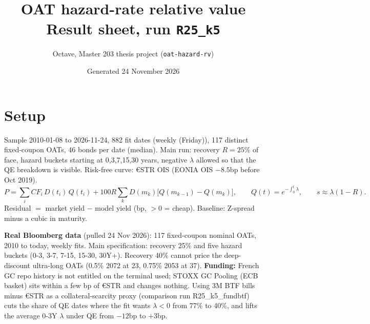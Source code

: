 \documentclass[10pt,a4paper]{article}
\title{\textbf{OAT hazard-rate relative value}\\\large Result sheet, run \texttt{R25\_k5}}
\author{Octave, Master 203 thesis project (\texttt{oat-hazard-rv})}
\date{Generated 24 November 2026}
\begin{document}
\maketitle


\section*{Setup}
Sample 2010-01-08 to 2026-11-24, 882 fit dates (weekly (Friday)),
117 distinct fixed-coupon OATs, 46 bonds per date (median).
Main run: recovery $R=25\%$ of face, hazard buckets starting at 0,3,7,15,30 years,
negative $\lambda$ allowed so that the QE breakdown is visible. Risk-free curve: €STR OIS
(EONIA OIS $-8.5$bp before Oct 2019).
\[
P=\sum_i CF_i\,D(t_i)\,Q(t_i)+100R\sum_k D(m_k)\big[Q(m_{k-1})-Q(m_k)\big],\qquad
Q(t)=e^{-\int_0^t\lambda},\qquad s\approx\lambda(1-R).
\]
Residual $=$ market yield $-$ model yield (bp, $>0$ = cheap). Baseline: Z-spread minus a cubic in maturity.

\textbf{Real Bloomberg data} (pulled 24 Nov 2026): 117 fixed-coupon nominal OATs, 2010 to today, weekly fits. Main specification: recovery 25\% and five hazard buckets (0-3, 3-7, 7-15, 15-30, 30Y+). Recovery 40\% cannot price the deep-discount ultra-long OATs (0.5\% 2072 at 23, 0.75\% 2053 at 37). \textbf{Funding:} French GC repo history is not entitled on the terminal used; STOXX GC Pooling (ECB basket) sits within a few bp of €STR and changes nothing. Using 3M BTF bills minus €STR as a collateral-scarcity proxy (comparison run R25\_k5\_fundbtf) cuts the share of QE dates where the fit wants $\lambda<0$ from 77\% to 40\%, and lifts the average 0-3Y $\lambda$ under QE from $-12$bp to $+3$bp.
\end{document}
